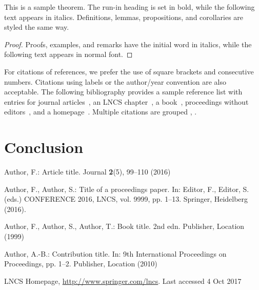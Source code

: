 \documentclass[runningheads,custombib]{llncs}
\begin{document}
\begin{theorem}
This is a sample theorem. The run-in heading is set in bold, while
the following text appears in italics. Definitions, lemmas,
propositions, and corollaries are styled the same way.
\end{theorem}
%
%
\begin{proof}
Proofs, examples, and remarks have the initial word in italics,
while the following text appears in normal font.
\end{proof}
For citations of references, we prefer the use of square brackets
and consecutive numbers. Citations using labels or the author/year
convention are also acceptable. The following bibliography provides
a sample reference list with entries for journal
articles~\cite{ref_article1}, an LNCS chapter~\cite{ref_lncs1}, a
book~\cite{ref_book1}, proceedings without editors~\cite{ref_proc1},
and a homepage~\cite{ref_url1}. Multiple citations are grouped
\cite{ref_article1,ref_lncs1,ref_book1},
\cite{ref_article1,ref_book1,ref_proc1,ref_url1}.
\section{Conclusion}
%
%
%
% 
% 

\begin{thebibliography}{8}
Author, F.: Article title. Journal \textbf{2}(5), 99--110 (2016)

Author, F., Author, S.: Title of a proceedings paper. In: Editor,
F., Editor, S. (eds.) CONFERENCE 2016, LNCS, vol. 9999, pp. 1--13.
Springer, Heidelberg (2016). 

Author, F., Author, S., Author, T.: Book title. 2nd edn. Publisher,
Location (1999)

Author, A.-B.: Contribution title. In: 9th International Proceedings
on Proceedings, pp. 1--2. Publisher, Location (2010)

LNCS Homepage, \url{http://www.springer.com/lncs}. Last accessed 4
Oct 2017

\printbibliography

\end{thebibliography}
\end{document}
